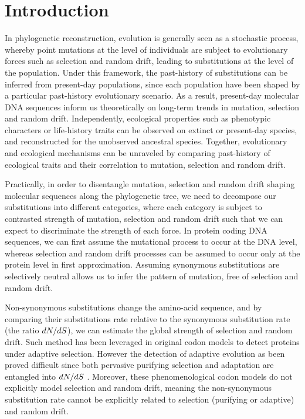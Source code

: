 

\section{Introduction}
\label{sec:Introduction}
In phylogenetic reconstruction, evolution is generally seen as a stochastic process, whereby point mutations at the level of individuals are subject to evolutionary forces such as selection and random drift, leading to substitutions at the level of the population.
Under this framework, the past-history of substitutions can be inferred from present-day populations, since each population have been shaped by a particular past-history evolutionary scenario.
As a result, present-day molecular DNA sequences inform us theoretically on long-term trends in mutation, selection and random drift.
Independently, ecological properties such as phenotypic characters or life-history traits can be observed on extinct or present-day species, and reconstructed for the unobserved ancestral species.
Together, evolutionary and ecological mechanisms can be unraveled by comparing past-history of ecological traits and their correlation to mutation, selection and random drift.

Practically, in order to disentangle mutation, selection and random drift shaping molecular sequences along the phylogenetic tree, we need to decompose our substitutions into different categories, where each category is subject to contrasted strength of mutation, selection and random drift such that we can expect to discriminate the strength of each force.
In protein coding DNA sequences, we can first assume the mutational process to occur at the DNA level, whereas selection and random drift processes can be assumed to occur only at the protein level in first approximation.
Assuming synonymous substitutions are selectively neutral allows us to infer the pattern of mutation, free of selection and random drift.

Non-synonymous substitutions change the amino-acid sequence, and by comparing their substitutions rate relative to the synonymous substitution rate (the ratio $dN/dS$), we can estimate the global strength of selection and random drift.
Such method has been leveraged in original codon models \citep{Muse1994,Goldman1994} to detect proteins under adaptive selection.
However the detection of adaptive evolution as been proved difficult since both pervasive purifying selection and adaptation are entangled into $dN/dS$ \citep{Yang2000}.
Moreover, these phenomenological codon models do not explicitly model selection and random drift, meaning the non-synonymous substitution rate cannot be explicitly related to selection (purifying or adaptive) and random drift.

